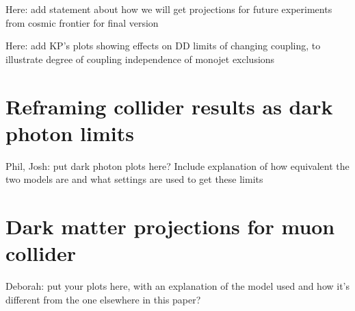 \documentclass[11pt]{article}
\begin{document}
{\color{red}Here: add statement about how we will get projections for future experiments from cosmic frontier for final version}

{\color{red}Here: add KP's plots showing effects on DD limits of changing coupling, to illustrate degree of coupling independence of monojet exclusions}

\section{Reframing collider results as dark photon limits}

Phil, Josh: put dark photon plots here?
Include explanation of how equivalent the two models are and what settings are used to get these limits

\section{Dark matter projections for muon collider}

Deborah: put your plots here, with an explanation of the model used and how it's different from the one elsewhere in this paper?


\clearpage






%



\end{document}
